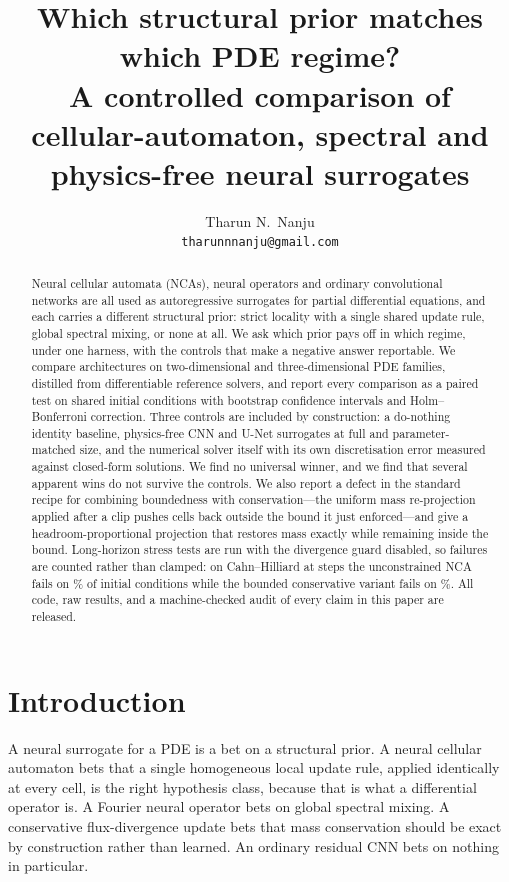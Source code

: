 \documentclass{article}
\title{Which structural prior matches which PDE regime?\\
       A controlled comparison of cellular-automaton, spectral and\\
       physics-free neural surrogates}
\author{%
  Tharun N.\ Nanju \\
  \texttt{tharunnnanju@gmail.com}
}
\date{}
\begin{document}
\maketitle

\begin{abstract}
Neural cellular automata (NCAs), neural operators and ordinary convolutional networks
are all used as autoregressive surrogates for partial differential equations, and each
carries a different structural prior: strict locality with a single shared update rule,
global spectral mixing, or none at all. We ask which prior pays off in which regime,
under one harness, with the controls that make a negative answer reportable. We compare
\Narchs{} architectures on \NpdesTwoD{} two-dimensional and \NpdesThreeD{}
three-dimensional PDE families, distilled from differentiable reference solvers, and
report every comparison as a paired test on shared initial conditions with bootstrap
confidence intervals and Holm--Bonferroni correction. Three controls are included by
construction: a do-nothing identity baseline, physics-free CNN and U-Net surrogates at
full and parameter-matched size, and the numerical solver itself with its own
discretisation error measured against closed-form solutions. We find no universal
winner, and we find that several apparent wins do not survive the controls. We also
report a defect in the standard recipe for combining boundedness with conservation---the
uniform mass re-projection applied after a clip pushes cells back outside the bound it
just enforced---and give a headroom-proportional projection that restores mass exactly
while remaining inside the bound. Long-horizon stress tests are run with the divergence
guard disabled, so failures are counted rather than clamped: on Cahn--Hilliard at
\stabHorizon{} steps the unconstrained NCA fails on \stabNCAFail\% of initial conditions
while the bounded conservative variant fails on \stabBoundedFail\%. All code, raw
results, and a machine-checked audit of every claim in this paper are released.
\end{abstract}

\section{Introduction}

A neural surrogate for a PDE is a bet on a structural prior. A neural cellular automaton
bets that a single homogeneous local update rule, applied identically at every cell, is
the right hypothesis class, because that is what a differential operator is. A Fourier
neural operator bets on global spectral mixing. A conservative flux-divergence update
bets that mass conservation should be exact by construction rather than learned. An
ordinary residual CNN bets on nothing in particular.
\end{document}
